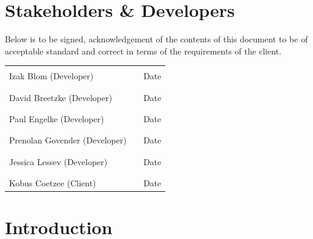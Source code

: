 \documentclass[11pt]{article}
\begin{document}
\newpage
\section{Stakeholders \& Developers}

Below is to be signed, acknowledgement of the contents of this document to be of acceptable standard and correct in terms of the requirements of the client.

\begin{table}[h]
\centering
\begin{tabular}{lll}
                              & \multicolumn{1}{L{3cm}}{} &    \multicolumn{1}{L{3cm}}{}    \\ \cline{1-1} \cline{3-3} 
Izak Blom (Developer)         &  & Date   \\
 & & \\
                              &  &        \\ \cline{1-1} \cline{3-3} 
David Breetzke (Developer)    &  & Date   \\
 & & \\
                              &  &        \\ \cline{1-1} \cline{3-3} 
Paul Engelke (Developer)      &  & Date   \\
 & & \\
                              &  &        \\ \cline{1-1} \cline{3-3} 
Prenolan Govender (Developer) &  & Date   \\
 & & \\
                              &  &        \\ \cline{1-1} \cline{3-3} 
Jessica Lessev (Developer)    &  & Date   \\
 & & \\
{\ul }                        &  & {\ul } \\ \cline{1-1} \cline{3-3} 
Kobus Coetzee (Client)        &  & Date  
\end{tabular}
\end{table}

\newpage
\section{Introduction}
\end{document}
